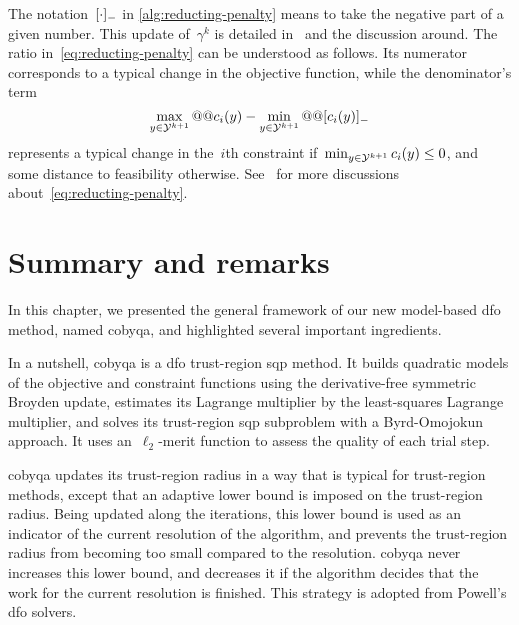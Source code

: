 The notation~$[\cdot]_-$ in \cref{alg:reducting-penalty} means to take the negative part of a given number.
This update of~$\gamma^k$ is detailed in~\cite[Eq.~(12) and~(13)]{Powell_1994} and the discussion around.
The ratio in~\cref{eq:reducting-penalty} can be understood as follows.
Its numerator corresponds to a typical change in the objective function, while the denominator's term
\begin{equation*}
    \max_{y \in \xpt[k + 1]} @@ \con{i}(y) - \min_{y \in \xpt[k + 1]} @@ \negp{\con{i}(y)}
\end{equation*}
represents a typical change in the~$i$th constraint if~$\min_{y \in \xpt[k + 1]} \con{i}(y) \le 0$, and some distance to feasibility otherwise.
See~\cite[\S~4]{Powell_1994} for more discussions about~\cref{eq:reducting-penalty}.

\section{Summary and remarks}

In this chapter, we presented the general framework of our new model-based \gls{dfo} method, named \gls{cobyqa}, and highlighted several important ingredients.

In a nutshell, \gls{cobyqa} is a \gls{dfo} trust-region \gls{sqp} method.
It builds quadratic models of the objective and constraint functions using the derivative-free symmetric Broyden update, estimates its Lagrange multiplier by the least-squares Lagrange multiplier, and solves its trust-region \gls{sqp} subproblem with a Byrd-Omojokun approach.
It uses an~$\ell_2$-merit function to assess the quality of each trial step.

\Gls{cobyqa} updates its trust-region radius in a way that is typical for trust-region methods, except that an adaptive lower bound is imposed on the trust-region radius.
Being updated along the iterations, this lower bound is used as an indicator of the current resolution of the algorithm, and prevents the trust-region radius from becoming too small compared to the resolution.
\Gls{cobyqa} never increases this lower bound, and decreases it if the algorithm decides that the work for the current resolution is finished.
This strategy is adopted from Powell's \gls{dfo} solvers.

